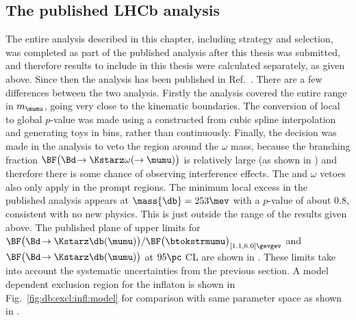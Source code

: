 \subsection{The published LHCb analysis}
The entire analysis described in this chapter, including strategy and selection, was completed
as part of the published \lhcb analysis after this thesis was submitted, and therefore results to
include in this thesis were calculated separately, as given above.
Since then the \lhcb analysis has been published in Ref.~\cite{LHCb-PAPER-2015-036}.
There are a few differences between the two analysis.
Firstly the \lhcb analysis covered the entire range in $m_{\mumu}$, going very close to the
kinematic boundaries.
The conversion of local to global $p$-value was made using a \PDF constructed from cubic spline
interpolation and generating toys in bins, rather than continuously.
Finally, the decision was made in the \lhcb analysis to veto the region around the $\omega$ mass,
because the branching fraction $\BF\big(\Bd\!\to\Kstarz\omega(\to\mumu)\big)$ is relatively large
(as shown in ) and therefore there is some chance of observing interference
effects.
The \phii and $\omega$ vetoes also only apply in the prompt regions.
The minimum local excess in the published \lhcb analysis appears at $\mass{\db}=253\mev$ with a
$p$-value of about 0.8, consistent with no new physics.
This is just outside the range of the results given above.
The published plane of upper limits for $\BF\big(\Bd\!\to\Kstarz\db(\mumu)\big) /
\BF\big(\btokstrmumu\big)_{[1.1,6.0]\gevgev}$ and $\BF\big(\Bd\!\to\Kstarz\db(\mumu)\big)$ at
$95\pc$ CL are shown in .
These limits take into account the systematic uncertainties from the previous section.
A model dependent exclusion region for the inflaton is shown in Fig.~\ref{fig:db:excl:infl:model}
for comparison with same parameter space as shown in .



